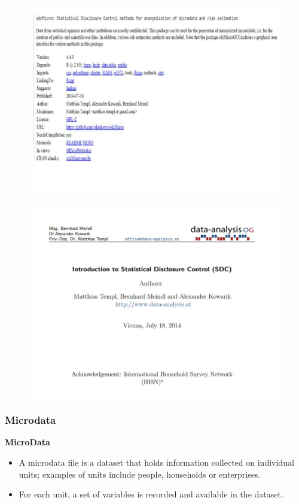 \documentclass{beamer}
\begin{document}
\begin{frame}
	\begin{figure}
		\centering
		\includegraphics[width=1.1\linewidth]{./JPEGS/Slide3}
		
	\end{figure}
\end{frame}
\begin{frame}
	\begin{figure}
		\centering
		\includegraphics[width=1.1\linewidth]{./JPEGS/Slide4}
	\end{figure}
\end{frame}
\begin{frame}

\frametitle{Microdata}
\textbf{MicroData}
\begin{itemize}
	\item
A microdata file is a dataset that holds information collected on individual units;
examples of units include people, households or enterprises. 
\item For each unit, a set of
variables is recorded and available in the dataset. 
\end{itemize}
\end{frame}
\end{document}

